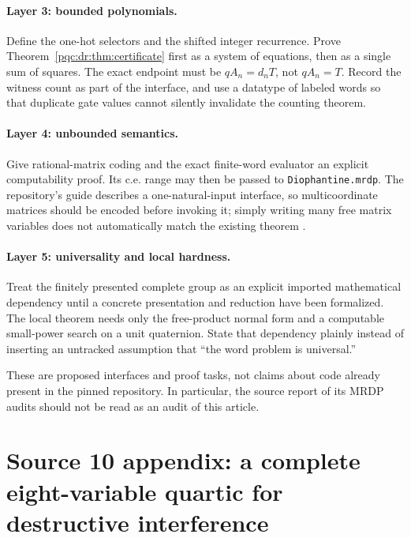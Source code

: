 \documentclass[11pt,letterpaper]{article}
\numberwithin{equation}{section}
\theoremstyle{definition}
\theoremstyle{remark}
\newcommand{\code}[1]{\nolinkurl{#1}}
\begin{document}
\paragraph{Layer 3: bounded polynomials.}
Define the one-hot selectors and the shifted integer recurrence. Prove
Theorem~\ref{pqc:dr:thm:certificate} first as a system of equations, then as a
single sum of squares. The exact endpoint must be
$qA_n=d_nT$, not $qA_n=T$. Record the witness count as part of the
interface, and use a datatype of labeled words so that duplicate gate
values cannot silently invalidate the counting theorem.

\paragraph{Layer 4: unbounded semantics.}
Give rational-matrix coding and the exact finite-word evaluator an
explicit computability proof. Its c.e. range may then be passed to
\code{Diophantine.mrdp}. The repository's guide describes a one-natural-input
interface, so multicoordinate matrices should be encoded before invoking
it; simply writing many free matrix variables does not automatically
match the existing theorem \cite{b62s16-ProveItMRDP}.

\paragraph{Layer 5: universality and local hardness.}
Treat the finitely presented complete group as an explicit imported
mathematical dependency until a concrete presentation and reduction have
been formalized. The local theorem needs only the free-product normal
form and a computable small-power search on a unit quaternion. State
that dependency plainly instead of inserting an untracked assumption
that ``the word problem is universal.''

These are proposed interfaces and proof tasks, not claims about code
already present in the pinned repository. In particular, the source
report of its MRDP audits should not be read as an audit of this article.

\section{Source 10 appendix: a complete eight-variable quartic for destructive interference}
\label{pqc:cc:app:quartic}
\end{document}
